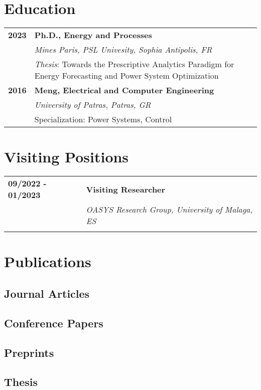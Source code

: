 \documentclass[11pt,a4paper]{article}
\makeatletter
\newlength{\datecolwidth}
\newenvironment{entrylist}{%
  \begin{longtable}{@{}p{\datecolwidth}@{\hspace{0.8em}}p{\dimexpr\linewidth-\datecolwidth-0.8em\relax}@{}}%
}{\end{longtable}}
\newcommand{\entry}[4]{%
  \textbf{#1} & \textbf{#2}\\[-0.2em]
              & {\itshape #3}\\[-0.2em]
              & #4\\[0.8em]
}
\makeatother
\begin{document}
\section*{Education}
\begin{entrylist}
  \entry{2023}{Ph.D., Energy and Processes}{Mines Paris, PSL Univesity, Sophia Antipolis, FR}
  {\emph{Thesis}: Towards the Prescriptive Analytics Paradigm for Energy Forecasting and Power System Optimization}
  \entry{2016}{Meng, Electrical and Computer Engineering}{University of Patras, Patras, GR}{
    Specialization: Power Systems, Control}
\end{entrylist}

\section*{Visiting Positions}
\begin{entrylist}
  \entry{09/2022 - 01/2023}{Visiting Researcher}{OASYS Research Group, University of Malaga, ES}{}
\end{entrylist}

\section*{Publications}

\nocite{*}

\subsection*{Journal Articles}
\printbibliography[keyword=peerjournal,heading=none]

\subsection*{Conference Papers}
\printbibliography[keyword=peerconf,heading=none]

\subsection*{Preprints}
\printbibliography[keyword=preprint,heading=none]

\subsection*{Thesis}
\printbibliography[heading = none, keyword=monographs]
\end{document}
